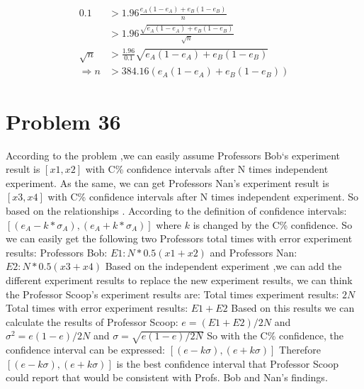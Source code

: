 \documentclass[12pt]{article}
\begin{document}
\begin{align*}
    0.1 &> 1.96 \frac{e_A(1-e_A) + e_B(1-e_B)}{n} \\
    &> 1.96 \frac{\sqrt{e_A(1-e_A) + e_B(1-e_B)}}{\sqrt{n}} \\
    \sqrt{n} &> \frac{1.96}{0.1} \sqrt{e_A(1-e_A) + e_B(1-e_B)} \\
    \Longrightarrow n &> 384.16 (e_A(1-e_A) + e_B(1-e_B))
\end{align*}




\section{Problem 36}
According to the problem ,we can easily assume Professors Bob‘s experiment result is $[ x1 , x2 ]$ with C\% confidence intervals after N times independent experiment. As the same, we can get Professors Nan’s experiment result is $[ x3 , x4 ]$ with C\% confidence intervals after N times independent experiment. So based on the relationships . According to the definition of confidence intervals:\newline
$[(e_{A} - k * \sigma_{A}), (e_{A} + k * \sigma_{A}) ]$ where $k$ is changed by the C\% confidence.\newline
So we can easily get the following two Professors total times with error experiment results:\newline
Professors Bob: $E1: N * 0.5(x1 + x2)$ and Professors Nan: $E2: N * 0.5(x3 + x4)$\newline
Based on the independent experiment ,we can add the different experiment results to replace the new experiment results, we can think the Professor Scoop’s experiment results are:\newline
Total times experiment results: $2N$\newline
Total times with error experiment results: $E1 + E2$\newline
Based on this results we can calculate the results of Professor Scoop:\newline
$e = (E1 + E2) / 2N$ and $\sigma^2 = e(1 - e) / 2N$ and $\sigma = \sqrt{e(1 - e) / 2N}$\newline
So with the C\% confidence, the confidence interval can be expressed:\newline
$[(e - k\sigma), (e+k\sigma)]$\newline
Therefore $[(e - k\sigma), (e+k\sigma)]$ is the best confidence interval that Professor Scoop could report that would be consistent with Profs. Bob and Nan’s findings.


% 
% 
\end{document}
